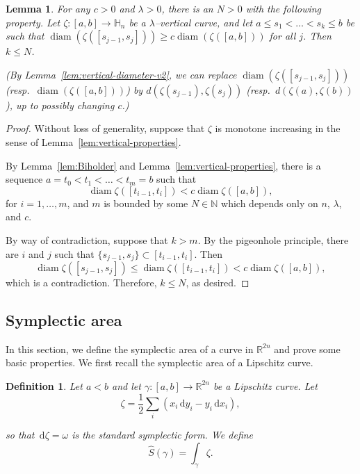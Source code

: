\documentclass[12pt,reqno]{amsart}
\newcommand{\HH}{\mathbb{H}}
\newcommand{\R}{\mathbb{R}}
\newcommand{\ud}[0]{\,\mathrm{d}}
\newcommand{\from}{\colon}
\newtheorem{lemma}[thm]{Lemma}
\newtheorem{defn}[thm]{Definition}
\theoremstyle{remark}
\newcommand{\0}{\mathbf{0}}
\renewcommand{\1}{\mathbf 1}
\DeclareMathOperator{\diam}{diam}
\begin{document}
\begin{lemma}\label{lem:chains}
  For any $c>0$ and $\lambda>0$, there is an $N>0$ with the following property. Let $\zeta\from [a,b]\to \HH_n$ be a $\lambda$--vertical curve, and let $a \le s_1 < \dots < s_k \le b$ be such that $\diam(\zeta([s_{j-1}, s_j])) \ge c \diam(\zeta([a,b]))$ for all $j$. Then $k \le N$. 
  
  (By Lemma~\ref{lem:vertical-diameter-v2}, we can replace $\diam(\zeta([s_{j-1}, s_j]))$ (resp.\ $\diam(\zeta([a,b]))$) by $d(\zeta(s_{j-1}),\zeta(s_j))$ (resp.\ $d(\zeta(a),\zeta(b))$), up to possibly changing $c$.)
\end{lemma}
\begin{proof}
  Without loss of generality, suppose that $\zeta$ is monotone increasing in the sense of Lemma~\ref{lem:vertical-properties}.  
  
  By Lemma~\ref{lem:Biholder} and Lemma~\ref{lem:vertical-properties}, there is a sequence $a = t_0 < t_1< \dots < t_m = b$ such that 
  $$
  \diam \zeta([t_{i-1}, t_{i}]) < c \diam \zeta([a,b]),
  $$
  for $i = 1,\dots, m$, and $m$ is bounded by some $N\in \mathbb{N}$ which depends only on $n$, $\lambda$, and $c$.

  By way of contradiction, suppose that $k > m$. By the pigeonhole principle, there are $i$ and $j$ such that $\{s_{j-1},s_j\} \subset [t_{i-1},t_i]$. Then 
  $$\diam \zeta([s_{j-1},s_j]) \le \diam \zeta([t_{i-1},t_i]) < c \diam \zeta([a,b]),$$
  which is a contradiction. Therefore, $k \le N$, as desired.
\end{proof}

\subsection{Symplectic area}\label{sec:symplectic}

In this section, we define the symplectic area of a curve in $\R^{2n}$ and prove some basic properties. We first recall the symplectic area of a Lipschitz curve.
\begin{defn}\label{def:Symplectic}
  Let $a<b$ and let $\gamma \from [a,b] \to \R^{2n}$ be a Lipschitz curve. Let
  \begin{equation}\label{eq:def-zeta}
    \zeta = \frac{1}{2} \sum_i (x_i \ud y_i - y_i \ud x_i),
  \end{equation}
    
  so that $\ud \zeta = \omega$ is the standard symplectic form. We define 
  \begin{equation}\label{eqn:SymplecticArea0}
  \hat{S}(\gamma) = \int_\gamma \zeta.
  \end{equation}
\end{defn}
\end{document}
